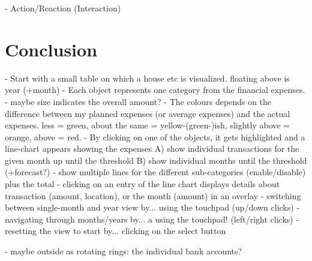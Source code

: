 - Action/Reaction (Interaction)





\section{Conclusion}




- Start with a small table on which a house etc is visualized. floating above is year (+month)
- Each object represents one category from the financial expenses.
- maybe size indicates the overall amount?
- The colours depends on the difference between my planned expenses (or average expenses) and the actual expenses. less = green, about the same = yellow-(green-)ish, slightly above = orange, above = red.
- By clicking on one of the objects, it gets highlighted and a line-chart appears showing the expenses
   A) show individual transactions for the given month up until the threshold
   B) show individual months until the threshold (+forecast?)
- show multiple lines for the different sub-categories (enable/disable) plus the total
- clicking on an entry of the line chart displays details about transaction (amount, location), or the month (amount) in an overlay
- switching between single-month and year view by... using the touchpad (up/down clicks)
- navigating through months/years by... a using the touchpad! (left/right clicks)
- resetting the view to start by... clicking on the select button

- maybe outside as rotating rings: the individual bank accounts?


